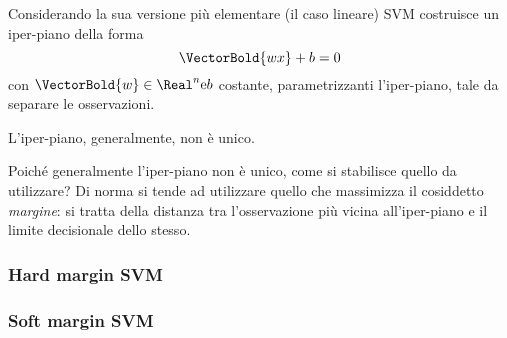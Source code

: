 \documentclass{subfiles}
\begin{document}
Considerando la sua versione più elementare (il caso lineare) SVM costruisce un iper-piano della forma
\[
    \VectorBold{wx} + b = 0
\]
con \(\VectorBold{w} \in \Real^{n} \text{e} b\) costante, parametrizzanti l'iper-piano,
tale da separare le osservazioni.

\begin{Remark*}
    L'iper-piano, generalmente, non è unico.
\end{Remark*}

Poiché generalmente l'iper-piano non è unico, come si stabilisce quello da utilizzare?
Di norma si tende ad utilizzare quello che massimizza il cosiddetto \emph{margine}:
si tratta della distanza tra l'osservazione più vicina all'iper-piano e il limite decisionale dello stesso.

\subsubsection{Hard margin SVM}


\subsubsection{Soft margin SVM}

\end{document}

